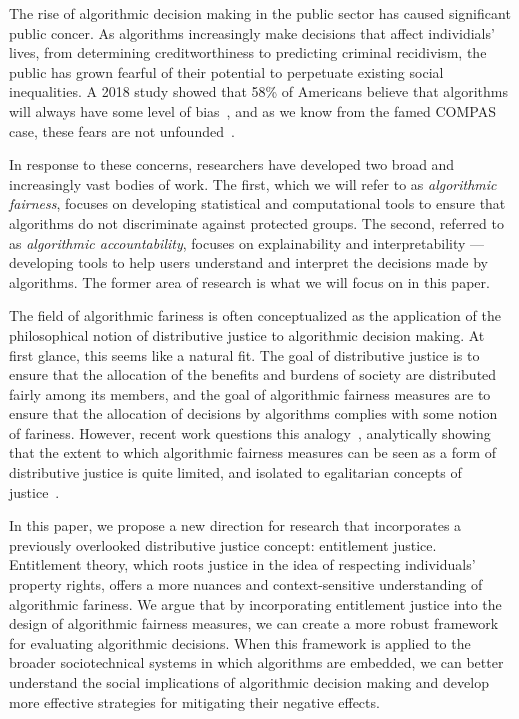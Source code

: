 
The rise of algorithmic decision making in the public sector has caused
significant public concer. As algorithms increasingly make decisions that affect
individials' lives, from determining creditworthiness to predicting criminal 
recidivism, the public has grown fearful of their potential to perpetuate 
existing social inequalities. A 2018 study showed that 58\% of Americans
believe that algorithms will always have some level of bias~\cite{Smith_2018}, 
and as we know from the famed COMPAS case, these fears are not
unfounded~\cite{Angwin_2016}.

In response to these concerns, researchers have developed two broad and
increasingly vast bodies of work. The first, which we will refer to as
\textit{algorithmic fairness}, focuses on developing statistical and
computational tools to ensure that algorithms do not discriminate against
protected groups. The second, referred to as \textit{algorithmic
accountability}, focuses on explainability and interpretability — developing
tools to help users understand and interpret the decisions made by algorithms. 
The former area of research is what we will focus on in this paper.

The field of algorithmic fariness is often conceptualized as the application of
the philosophical notion of distributive justice to algorithmic decision
making. At first glance, this seems like a natural fit. The goal of distributive
justice is to ensure that the allocation of the benefits and burdens of society
are distributed fairly among its members, and the goal of algorithmic fairness
measures are to ensure that the allocation of decisions by algorithms complies
with some notion of fariness. However, recent work questions this
analogy~\cite{Hertweck_2024}, analytically showing that the extent to which 
algorithmic fairness measures can be seen as a form of distributive justice
is quite limited, and isolated to egalitarian concepts of
justice~\cite{Kuppler_2021}.

In this paper, we propose a new direction for research that incorporates a 
previously overlooked distributive justice concept: entitlement justice.
Entitlement theory, which roots justice in the idea of respecting individuals'
property rights, offers a more nuances and context-sensitive understanding of
algorithmic fariness. We argue that by incorporating entitlement justice into
the design of algorithmic fairness measures, we can create a more robust
framework for evaluating algorithmic decisions. When this framework is applied
to the broader sociotechnical systems in which algorithms are embedded, we can
better understand the social implications of algorithmic decision making and
develop more effective strategies for mitigating their negative effects.

